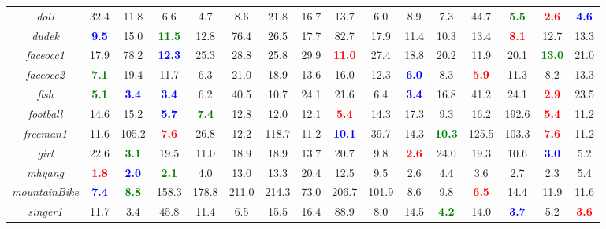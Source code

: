 \documentclass[preprint,12pt,review]{elsarticle}
\begin{document}
\begin{table*}[htp]
{\begin{tabular}{|c|c|c|c|c|c|c|c|c|c|c|c|c|c|c|c|}
%
\emph{doll}   &32.4   &11.8  &6.6 &4.7  &8.6 &21.8  &16.7  &13.7  &6.0  &8.9 &7.3 &44.7 &\textcolor{green}{\textbf{5.5}}  &\textcolor{red}{\textbf{2.6}}  &\textcolor{blue}{\textbf{4.6}}\\
%
\emph{dudek}   &\textcolor{blue}{\textbf{9.5}}  &15.0  &\textcolor{green}{\textbf{11.5}}  &12.8  &76.4 &26.5 &17.7 &82.7 &17.9 &11.4 &10.3 &13.4  &\textcolor{red}{\textbf{8.1}}  &12.7  &13.3 \\
%
\emph{faceocc1}   &17.9  &78.2  &\textcolor{blue}{\textbf{12.3}} &25.3  &28.8  &25.8  &29.9  &\textcolor{red}{\textbf{11.0}} &27.4 &18.8  &20.2  &11.9  &20.1 &\textcolor{green}{\textbf{13.0}} &21.0\\
%
\emph{faceocc2}  &\textcolor{green}{\textbf{7.1}}  &19.4  &11.7 &6.3  &21.0   &18.9  &13.6  &16.0  &12.3  &\textcolor{blue}{\textbf{6.0}} &8.3 &\textcolor{red}{\textbf{5.9}}  &11.3  &8.2 &13.3\\
%
\emph{fish}   &\textcolor{green}{\textbf{5.1}}  &\textcolor{blue}{\textbf{3.4}}  &\textcolor{blue}{\textbf{3.4}}   &6.2  &40.5 &10.7  &24.1  &21.6  &6.4  &\textcolor{blue}{\textbf{3.4}}  &16.8 &41.2 &24.1 &\textcolor{red}{\textbf{2.9}}  &23.5\\
%
\emph{football}   &14.6  &15.2  &\textcolor{blue}{\textbf{5.7}} &\textcolor{green}{\textbf{7.4}}  &12.8  &12.0  &12.1  &\textcolor{red}{\textbf{5.4}}  &14.3  &17.3  &9.3  &16.2  &192.6  &\textcolor{red}{\textbf{5.4}}  &11.2\\
%
\emph{freeman1}   &11.6  &105.2  &\textcolor{red}{\textbf{7.6}}  &26.8  &12.2 &118.7  &11.2 &\textcolor{blue}{\textbf{10.1}} &39.7 &14.3 &\textcolor{green}{\textbf{10.3}}  &125.5  &103.3  &\textcolor{red}{\textbf{7.6}} &11.2\\
%
\emph{girl}   &22.6  &\textcolor{green}{\textbf{3.1}}  &19.5  &11.0  &18.9  &18.9 &13.7 &20.7  &9.8  &\textcolor{red}{\textbf{2.6}}   &24.0  &19.3  &10.6  &\textcolor{blue}{\textbf{3.0}} &5.2\\
%
\emph{mhyang}   &\textcolor{red}{\textbf{1.8}}  &\textcolor{blue}{\textbf{2.0}}  &\textcolor{green}{\textbf{2.1}} &4.0 &13.0 &13.3  &20.4 &12.5 &9.5 &2.6 &4.4 &3.6 &2.7 &2.3 &5.4\\
%
\emph{mountainBike}   &\textcolor{blue}{\textbf{7.4}}  &\textcolor{green}{\textbf{8.8}}  &158.3  &178.8 &211.0 &214.3  &73.0  &206.7  &101.9 &8.6  &9.8  &\textcolor{red}{\textbf{6.5}}  &14.4  &11.9 &11.6\\
%
\emph{singer1}   &11.7  &3.4  &45.8 &11.4  &6.5  &15.5 &16.4 &88.9 &8.0 &14.5 &\textcolor{green}{\textbf{4.2}}  &14.0 &\textcolor{blue}{\textbf{3.7}} &5.2  &\textcolor{red}{\textbf{3.6}} \\

\end{tabular}}
\end{table*}
\end{document}
